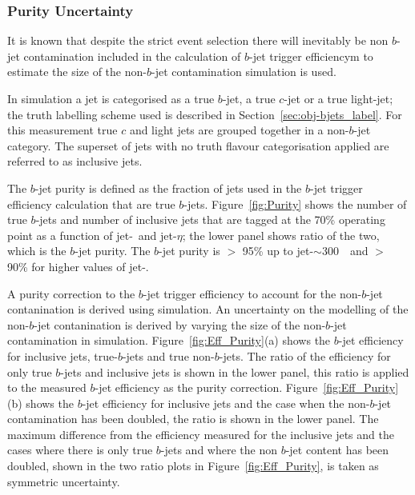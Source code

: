 \subsubsection{Purity Uncertainty}
\label{sec:trig-purity}

It is known that despite the strict event selection there will inevitably be non $b$-jet contamination included in the calculation of $b$-jet trigger efficiencym
to estimate the size of the non-$b$-jet contamination simulation is used.

In simulation a jet is categorised as a true $b$-jet, a true $c$-jet or a true light-jet;
the truth labelling scheme used is described in Section~\ref{sec:obj-bjets_label}.
For this measurement true $c$ and light jets are grouped together in a non-$b$-jet category.
The superset of jets with no truth flavour categorisation applied are referred to as inclusive jets.

The $b$-jet purity is defined as the fraction of jets used in the $b$-jet trigger efficiency calculation that are true $b$-jets.
Figure~\ref{fig:Purity} shows the number of true $b$-jets and number of inclusive jets that are tagged at the 70\% operating point as a function of jet-\pT~and jet-$\eta$;
the lower panel shows ratio of the two, which is the $b$-jet purity.
The $b$-jet purity is $>$ 95\% up to jet-\pT$\sim$300~\GeV~and $>$ 90\% for higher values of jet-\pT.

A purity correction to the $b$-jet trigger efficiency to account for the non-$b$-jet contanination is derived using simulation.
An uncertainty on the modelling of the non-$b$-jet contanination is derived by varying the size of the non-$b$-jet contamination in simulation.
Figure~\ref{fig:Eff_Purity}(a) shows the $b$-jet efficiency for inclusive jets, true-$b$-jets and true non-$b$-jets.
The ratio of the efficiency for only true $b$-jets and inclusive jets is shown in the lower panel,
this ratio is applied to the measured $b$-jet efficiency as the purity correction.
Figure~\ref{fig:Eff_Purity}(b) shows the $b$-jet efficiency for inclusive jets and the case when the non-$b$-jet contamination has been doubled,
the ratio is shown in the lower panel.
The maximum difference from the efficiency measured for the inclusive jets and the cases
where there is only true $b$-jets and where the non $b$-jet content has been doubled,
shown in the two ratio plots in Figure~\ref{fig:Eff_Purity}, is taken as symmetric uncertainty.

